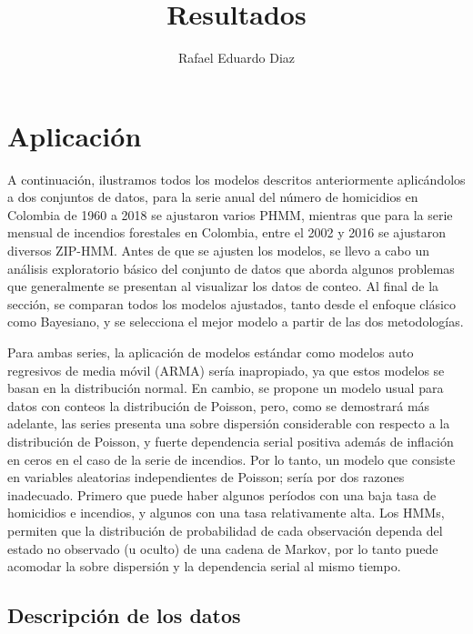 \documentclass[a4paper]{article}\usepackage[]{graphicx}\usepackage[]{color}
\title{Resultados} %
\author{Rafael Eduardo Diaz} %
\begin{document}
\maketitle
\section{Aplicación}

A continuación, ilustramos todos los modelos descritos anteriormente aplicándolos a dos conjuntos de datos, para la serie anual del número de homicidios en Colombia de 1960 a 2018 se ajustaron varios PHMM, mientras que para la serie mensual de incendios forestales en Colombia, entre el 2002 y 2016 se ajustaron diversos ZIP-HMM. Antes de que se ajusten los modelos, se llevo a cabo un análisis exploratorio básico del conjunto de datos que aborda algunos problemas que generalmente se presentan al visualizar los datos de conteo. Al final de la sección, se comparan todos los modelos ajustados, tanto desde el enfoque clásico como Bayesiano, y se selecciona el mejor modelo a partir de las dos metodologías. 

\vspace{5mm} %

Para ambas series, la aplicación de modelos estándar como modelos auto regresivos de media móvil (ARMA) sería inapropiado, ya que estos modelos se basan en la distribución normal. En cambio, se propone un modelo usual para datos con conteos la distribución de Poisson, pero, como se demostrará más adelante, las series presenta una sobre dispersión considerable con respecto a la distribución de Poisson, y fuerte dependencia serial positiva además de inflación en ceros en el caso de la serie de incendios. Por lo tanto, un modelo que consiste en variables aleatorias independientes de Poisson; sería por dos razones inadecuado. Primero que puede haber algunos períodos con una baja tasa de homicidios e incendios, y algunos con una tasa relativamente alta. Los HMMs, permiten que la distribución de probabilidad de cada observación dependa del estado no observado (u oculto) de una cadena de Markov, por lo tanto puede acomodar la sobre dispersión y la dependencia serial al mismo tiempo.



\subsection{Descripción de los datos}
\end{document}
